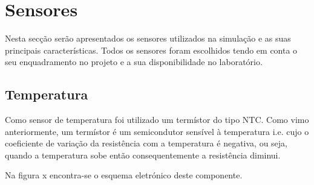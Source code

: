 \newpage
\section{Sensores}

Nesta secção serão apresentados os sensores utilizados na simulação e as suas principais características. Todos os sensores foram escolhidos tendo em conta o seu enquadramento no projeto e a sua disponibilidade no laboratório. 


\subsection{Temperatura}

Como sensor de temperatura foi utilizado um termístor do tipo \ac{NTC}. Como vimo anteriormente, um termístor é um semicondutor sensível à temperatura i.e. cujo o coeficiente de variação da resistência com a temperatura é negativa, ou seja, quando a temperatura sobe então consequentemente a resistência diminui. 

Na figura x encontra-se o esquema eletrónico deste componente. 

